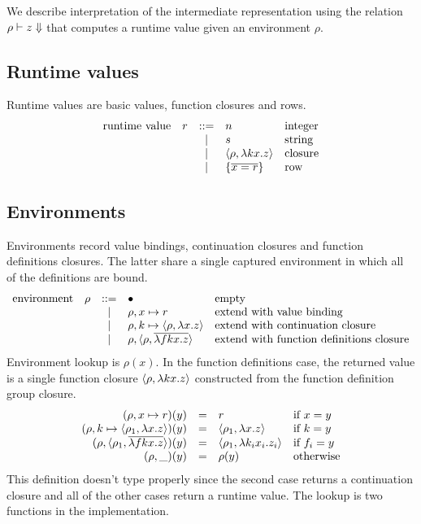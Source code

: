 \documentclass[11pt]{article}
\begin{document}
\newcommand{\extv}[3]{#1, #2 \mapsto #3}
\newcommand{\extc}[5]{\extv{#1}{#2}{\clsc{#3}{#4}{#5}}}
\newcommand{\extf}[6]{#1, \clsfs{#2}{#3}{#4}{#5}{#6}}
\newcommand{\extff}[2]{#1, \clsffs{#2}}

We describe interpretation of the intermediate representation using the relation $\rho |- z \Downarrow$ that computes a runtime value given an environment $\rho$.

\subsection*{Runtime values}

Runtime values are basic values, function closures and rows.
\[
\begin{array}{rlcll}
\text{runtime value}
  & r & ::= & n              & \text{integer}  \\
  &   & |   & s              & \text{string} \\
  &   & |   & \langle \rho, \lambda k x . z \rangle  & \text{closure} \\
  &   & |   & \{ \overline{x = r} \}           & \text{row} \\
\end{array}
\]

\subsection*{Environments}

Environments record value bindings, continuation closures and function definitions  closures.
The latter share a single captured environment in which all of the definitions are bound.
\[
\begin{array}{rlcll}
\text{environment}
  & \rho & ::= & \bullet                       & \text{empty} \\
  &      & |   & \extv{\rho}{x}{r}             & \text{extend with value binding} \\
  &      & |   & \extc{\rho}{k}{\rho}{x}{z}    & \text{extend with continuation closure} \\
  &      & |   & \extf{\rho}{\rho}{f}{k}{x}{z} & \text{extend with function definitions closure}
\end{array}
\]
Environment lookup is $\rho(x)$.
In the function definitions case, the returned value is a single function closure $\langle \rho, \lambda k x . z \rangle$ constructed from the function definition group closure.
\[
\begin{array}{rlll}
(\extv{\rho}{x}{r})(y) & = &
  r &
  \text{if $x = y$} \\
(\extc{\rho}{k}{\rho_1}{x}{z})(y) & = &
  \clsc{\rho_1}{x}{z} &
  \text{if $k = y$} \\
(\extf{\rho}{\rho_1}{f}{k}{x}{z})(y) & = &
  \clsf{\rho_1}{k_i}{x_i}{z_i} &
  \text{if $f_i = y$} \\
(\rho, \_)(y) & = &
  \rho(y) &
  \text{otherwise}
\end{array}
\]
This definition doesn't type properly since the second case returns a continuation closure and all of the other cases return a runtime value.
The lookup is two functions in the implementation.
\end{document}
